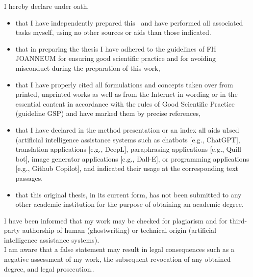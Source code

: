 %


	\thispagestyle{empty}
	
	{\hfill\fontfamily{\sfdefault}\bfseries\fontsize{22}{22}\selectfont{Declaration of Honour}}\vspace*{1cm}
	
	\noindent I hereby declare under oath,
	
	\begin{itemize}
		\item {that I have independently prepared this \DocTypeText~and have performed all associated tasks myself, using no other sources or aids than those indicated.}
		\item {that in preparing the thesis I have adhered to the guidelines of FH JOANNEUM for ensuring good scientific practice and for avoiding misconduct during the preparation of this work,}
		\item {that I have properly cited all formulations and concepts taken over from printed, unprinted works as well as from the Internet in wording or in the essential content in accordance with the rules of Good Scientific Practice (guideline GSP) and have marked them by precise references,}
		\item {that I have declared in the method presentation or an index all aids u1sed (artificial intelligence assistance systems such as chatbots [e.g., ChatGPT], translation applications [e.g., DeepL], paraphrasing applications [e.g., Quill bot], image generator applications [e.g., Dall-E], or programming applications [e.g., Github Copilot], and indicated their usage at the corresponding text passages.}
		\item {that this original thesis, in its current form, has not been submitted to any other academic institution for the purpose of obtaining an academic degree.}
	\end{itemize}
	
	\noindent I have been informed that my work may be checked for plagiarism and for third-party authorship of human (ghostwriting) or technical origin (artificial intelligence assistance systems).\\
	
	\noindent I am aware that a false statement may result in legal consequences such as a negative assessment of my work, the subsequent revocation of any obtained degree, and legal prosecution..
	
	
	\ifthenelse{\equal{\Style}{\Book}}
	{
		\newpage\null\thispagestyle{empty}\newpage
	}
	{
	}
	
